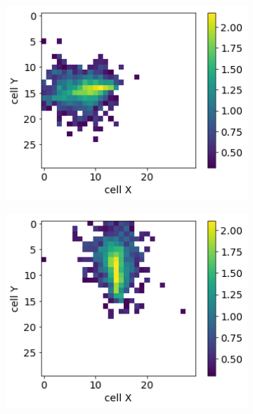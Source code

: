 \begin{figure}
\begin{subfigure}{0.24\textwidth}
  \end{subfigure}
    \begin{subfigure}{0.24\textwidth}
    \centering
    \includegraphics[width=1\textwidth]{figures/3_real.png}
  \end{subfigure}
  \begin{subfigure}{0.24\textwidth}
    \centering
    \includegraphics[width=1\textwidth]{figures/4_real.png}

\end{subfigure}
\end{figure}

